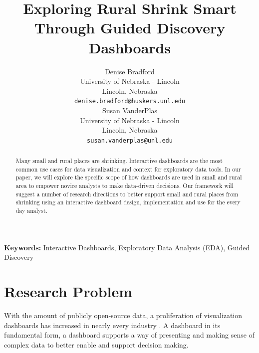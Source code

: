 \documentclass[10pt]{article}\usepackage[]{graphicx}\usepackage[]{color}
\title{Exploring Rural Shrink Smart Through Guided Discovery Dashboards}
\author{
  Denise Bradford \\
  University of Nebraska - Lincoln \\
  Lincoln, Nebraska \\
  {\tt denise.bradford@huskers.unl.edu} \\\And
  Susan VanderPlas \\
  University of Nebraska - Lincoln \\
  Lincoln, Nebraska \\
  {\tt susan.vanderplas@unl.edu} \\}
\date{}
\begin{document}
\maketitle
\begin{abstract}
Many small and rural places are shrinking. Interactive dashboards are the most common use cases for data visualization and context for exploratory data tools. In our paper, we will explore the specific scope of how dashboards are used in small and rural area to empower novice analysts to make data-driven decisions. Our framework will suggest a number of research directions to better support small and rural places from shrinking using an interactive dashboard design, implementation and use for the every day analyst. 
\end{abstract}

{\bf Keywords:} Interactive Dashboards, Exploratory Data Analysis (EDA), Guided Discovery

\section{Research Problem}
With the amount of publicly open-source data, a proliferation of visualization dashboards has increased in nearly every industry \cite{fisher}. A dashboard in its fundamental form, a dashboard supports a way of presenting and making sense of complex data to better enable and support decision making. 

% 
\end{document}
